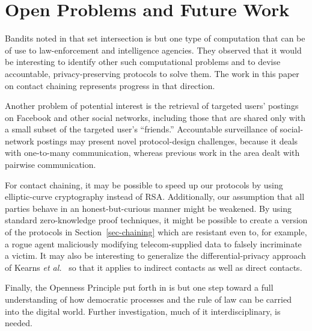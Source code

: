 \section{Open Problems and Future Work}\label{sec-future}
Bandits noted in \cite[Section 6.1]{sff-foci2014} that
set intersection is but one type of computation that can be of use
to law-enforcement and intelligence agencies.  They observed that it 
would be interesting to identify other such computational problems 
and to devise accountable, privacy-preserving protocols to solve them.  
The work in this paper on contact chaining represents progress in that
direction.  

Another problem of potential interest is the retrieval of
targeted users' postings on Facebook and other social networks, including 
those that are shared only with a small subset of the targeted user's 
``friends.'' Accountable surveillance of social-network postings may present 
novel protocol-design challenges, because it deals with one-to-many 
communication, whereas previous work in the area dealt with pairwise 
communication.

For contact chaining, it may be possible to speed up our protocols by using
elliptic-curve cryptography instead of RSA. Additionally, our assumption that
all parties behave in an honest-but-curious manner might be weakened. By using
standard zero-knowledge proof techniques, it might be possible to create a version
of the protocols in Section~\ref{sec-chaining} which are resistant even to, for
example, a rogue agent maliciously modifying telecom-supplied data to falsely
incriminate a victim. It may also be interesting to 
generalize the differential-privacy approach of Kearns {\it et 
al.}~\cite{krwy-pnas16} so that it applies to indirect contacts as well as
direct contacts.



Finally, the Openness Principle put forth in \cite{sff-foci2014} is but one step
toward a full understanding of how democratic processes and the rule of law
can be carried into the digital world.  Further investigation, much of it
interdisciplinary, is needed.

